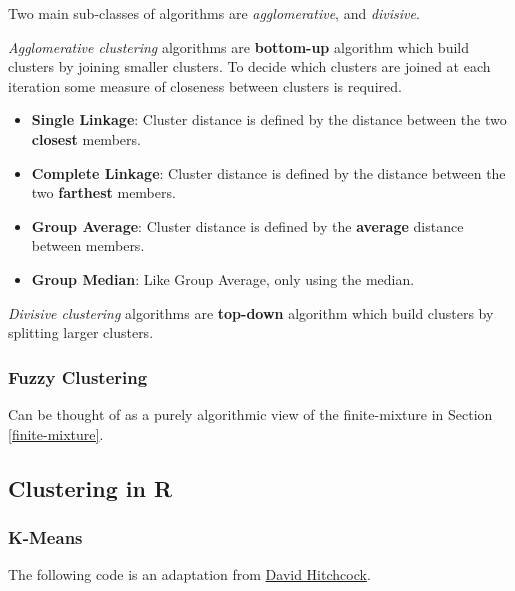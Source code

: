\documentclass[]{book}
\newenvironment{Shaded}{\begin{snugshade}}{\end{snugshade}}
\newcommand{\KeywordTok}[1]{\textcolor[rgb]{0.13,0.29,0.53}{\textbf{{#1}}}}
\newcommand{\DataTypeTok}[1]{\textcolor[rgb]{0.13,0.29,0.53}{{#1}}}
\newcommand{\DecValTok}[1]{\textcolor[rgb]{0.00,0.00,0.81}{{#1}}}
\newcommand{\FloatTok}[1]{\textcolor[rgb]{0.00,0.00,0.81}{{#1}}}
\newcommand{\StringTok}[1]{\textcolor[rgb]{0.31,0.60,0.02}{{#1}}}
\newcommand{\CommentTok}[1]{\textcolor[rgb]{0.56,0.35,0.01}{\textit{{#1}}}}
\newcommand{\NormalTok}[1]{{#1}}
\providecommand{\tightlist}{%
  \setlength{\itemsep}{0pt}\setlength{\parskip}{0pt}}
\theoremstyle{definition}
\theoremstyle{definition}
\theoremstyle{remark}
\begin{document}
Two main sub-classes of algorithms are \emph{agglomerative}, and
\emph{divisive}.

\emph{Agglomerative clustering} algorithms are \textbf{bottom-up}
algorithm which build clusters by joining smaller clusters. To decide
which clusters are joined at each iteration some measure of closeness
between clusters is required.

\begin{itemize}
\tightlist
\item
  \textbf{Single Linkage}: Cluster distance is defined by the distance
  between the two \textbf{closest} members.
\item
  \textbf{Complete Linkage}: Cluster distance is defined by the distance
  between the two \textbf{farthest} members.
\item
  \textbf{Group Average}: Cluster distance is defined by the
  \textbf{average} distance between members.
\item
  \textbf{Group Median}: Like Group Average, only using the median.
\end{itemize}

\emph{Divisive clustering} algorithms are \textbf{top-down} algorithm
which build clusters by splitting larger clusters.

\subsubsection{Fuzzy Clustering}\label{fuzzy-clustering}

Can be thought of as a purely algorithmic view of the finite-mixture in
Section \ref{finite-mixture}.

\subsection{Clustering in R}\label{clustering-in-r}

\subsubsection{K-Means}\label{k-means-2}

The following code is an adaptation from
\href{http://people.stat.sc.edu/Hitchcock/chapter6_R_examples.txt}{David
Hitchcock}.

\begin{Shaded}
\end{Shaded}
\end{document}
